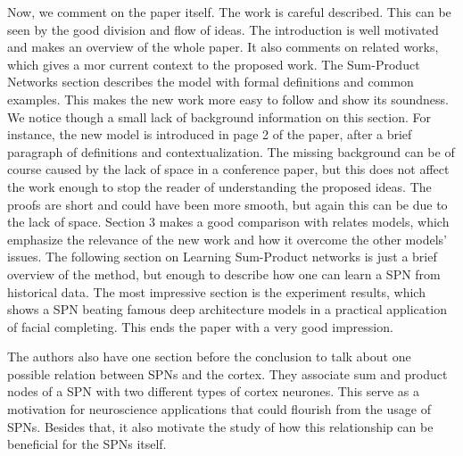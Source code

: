 Now, we comment on the paper itself.
The work is careful described.
This can be seen by the good division and flow of ideas.
The introduction is well motivated and makes an overview of the whole paper.
It also comments on related works, which gives a mor current context to the proposed work.
The Sum-Product Networks section describes the model with formal definitions and common examples.
This makes the new work more easy to follow and show its soundness.
We notice though a small lack of background information on this section.
For instance, the new model is introduced in page 2 of the paper, after a brief paragraph of definitions and contextualization.
The missing background can be of course caused by the lack of space in a conference paper, but this does not affect the work enough to stop the reader of understanding the proposed ideas.
The proofs are short and could have been more smooth, but again this can be due to the lack of space.
Section 3 makes a good comparison with relates models, which emphasize the relevance of the new work and how it overcome the other models' issues.
The following section on Learning Sum-Product networks is just a brief overview of the method, but enough to describe how one can learn a SPN from historical data.
The most impressive section is the experiment results, which shows a SPN beating famous deep architecture models in a practical application of facial completing.
This ends the paper with a very good impression.

The authors also have one section before the conclusion to talk about one possible relation between SPNs and the cortex.
They associate sum and product nodes of a SPN with two different types of cortex neurones.
This serve as a motivation for neuroscience applications that could flourish from the usage of SPNs.
Besides that, it also motivate the study of how this relationship can be beneficial for the SPNs itself.
